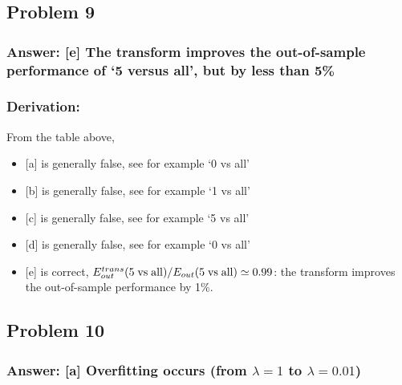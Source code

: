 \documentclass[11pt]{article}
\providecommand{\tightlist}{%
      \setlength{\itemsep}{0pt}\setlength{\parskip}{0pt}}
\begin{document}
    \hypertarget{problem-9}{%
\subsection{Problem 9}\label{problem-9}}

\hypertarget{answer-e-the-transform-improves-the-out-of-sample-performance-of-5-versus-all-but-by-less-than-5}{%
\subsubsection{Answer: {[}e{]} The transform improves the out-of-sample
performance of `5 versus all', but by less than
5\%}\label{answer-e-the-transform-improves-the-out-of-sample-performance-of-5-versus-all-but-by-less-than-5}}

\hypertarget{derivation}{%
\subsubsection{Derivation:}\label{derivation}}

From the table above,

\begin{itemize}
\tightlist
\item
  {[}a{]} is generally false, see for example `0 vs all'
\item
  {[}b{]} is generally false, see for example `1 vs all'
\item
  {[}c{]} is generally false, see for example `5 vs all'
\item
  {[}d{]} is generally false, see for example `0 vs all'
\item
  {[}e{]} is correct,
  \(E^{trans}_{out}({\rm 5\; vs\; all})/E_{out}({\rm 5\; vs\; all})\simeq 0.99\):
  the transform improves the out-of-sample performance by 1\%.
\end{itemize}

    \hypertarget{problem-10}{%
\subsection{Problem 10}\label{problem-10}}

\hypertarget{answer-a-overfitting-occurs-from-lambda1-to-lambda0.01}{%
\subsubsection{\texorpdfstring{Answer: {[}a{]} Overfitting occurs (from
\(\lambda=1\) to
\(\lambda=0.01\))}{Answer: {[}a{]} Overfitting occurs (from \textbackslash{}lambda=1 to \textbackslash{}lambda=0.01)}}\label{answer-a-overfitting-occurs-from-lambda1-to-lambda0.01}}
\end{document}
